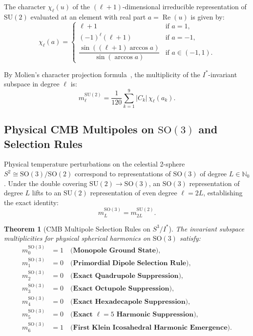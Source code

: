 \documentclass[11pt,a4paper]{article}
\newtheorem{theorem}{Theorem}[section]
\theoremstyle{definition}
\newcommand{\SO}{\mathrm{SO}}
\newcommand{\SU}{\mathrm{SU}}
\begin{document}
The character $\chi_\ell(u)$ of the $(\ell + 1)$-dimensional irreducible representation of $\SU(2)$ evaluated at an element with real part $a = \operatorname{Re}(u)$ is given by:
\begin{equation}
\chi_\ell(a) = \begin{cases}
\ell + 1 & \text{if } a = 1, \\
(-1)^\ell (\ell + 1) & \text{if } a = -1, \\
\dfrac{\sin((\ell + 1)\arccos a)}{\sin(\arccos a)} & \text{if } a \in (-1, 1).
\end{cases}
\end{equation}

By Molien's character projection formula~\cite{Molien1897}, the multiplicity of the $I^*$-invariant subspace in degree $\ell$ is:
\begin{equation}
m_\ell^{\SU(2)} = \frac{1}{120} \sum_{k=1}^9 |C_k|\,\chi_\ell(a_k).
\end{equation}

\subsection{Physical CMB Multipoles on $\SO(3)$ and Selection Rules}

Physical temperature perturbations on the celestial 2-sphere $S^2 \cong \SO(3)/\SO(2)$ correspond to representations of $\SO(3)$ of degree $L \in \mathbb{N}_0$. Under the double covering $\SU(2) \to \SO(3)$, an $\SO(3)$ representation of degree $L$ lifts to an $\SU(2)$ representation of even degree $\ell = 2L$, establishing the exact identity:
\begin{equation}
m_L^{\SO(3)} = m_{2L}^{\SU(2)}.
\end{equation}

\begin{theorem}[CMB Multipole Selection Rules on $S^3 / I^*$]
The invariant subspace multiplicities for physical spherical harmonics on $\SO(3)$ satisfy:
\begin{align}
m_0^{\SO(3)} &= 1 \quad \textbf{(Monopole Ground State)}, \\
m_1^{\SO(3)} &= 0 \quad \textbf{(Primordial Dipole Selection Rule)}, \\
m_2^{\SO(3)} &= 0 \quad \textbf{(Exact Quadrupole Suppression)}, \\
m_3^{\SO(3)} &= 0 \quad \textbf{(Exact Octupole Suppression)}, \\
m_4^{\SO(3)} &= 0 \quad \textbf{(Exact Hexadecapole Suppression)}, \\
m_5^{\SO(3)} &= 0 \quad \textbf{(Exact $\ell=5$ Harmonic Suppression)}, \\
m_6^{\SO(3)} &= 1 \quad \textbf{(First Klein Icosahedral Harmonic Emergence)}.
\end{align}
\end{theorem}
\end{document}
